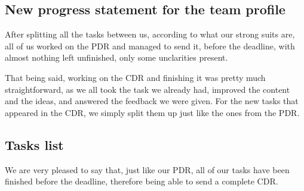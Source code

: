 \subsection{New progress statement for the team profile}

After splitting all the tasks between us, according to what our strong suits are, all of us worked on the PDR and managed to send it, before the deadline, with almost nothing left unfinished, only some unclarities present. 

That being said, working on the CDR and finishing it was pretty much straightforward, as we all took the task we already had, improved the content and the ideas, and answered the feedback we were given. For the new tasks that appeared in the CDR, we simply split them up just like the ones from the PDR.

\subsection{Tasks list}

We are very pleased to say that, just like our PDR, all of our tasks have been finished before the deadline, therefore being able to send a complete CDR.

\newcommand{\done}{\textbf{\textcolor{green!50!black}{Done}}}

